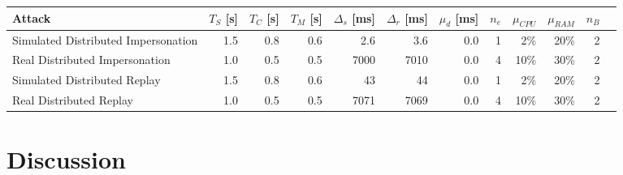 \documentclass[sigconf]{acmart}
\makeatletter
\newcommand{\Botnet}{CPSBot\@\xspace}
\makeatother
\begin{document}
\begin{table*}[tb]
    \centering
    \caption{Evaluation of \Botnet attacks in a simulated environment and real testbed.
    $T_S$, $T_C$, $T_M$ are the SCADA, adversarial estimation and traffic
    manipulation periods.
    $\Delta_{s}$ is the average time difference between the last valid RTU packet and the first
    packet spoofed by a bot.
    $\Delta_{r}$ is the average time difference between the last SCADA request and the first
    valid spoofed bot response.
    $\mu_{d}$ is the additional average delay introduced by the \Botnet measured
    from the SCADA server.
    $n_{e}$ is the number of Wireshark's expert info warnings and error
    messages.
    $\mu_{CPU}$ and $\mu_{RAM}$ are the approximate average CPU and RAM load
    on each bot. $n_B$ is the number of controlled substations.
    Our optimized \Botnet implementation is able to attack the system with delay ($\mu_d = 0$) as measured at the SCADA server.}
    \label{tab:attack-eval}
    \begin{tabular}{lrrrrrrrrrrr}
    \toprule
      \textbf{Attack} & $T_S$ [s]& $T_C$ [s] & $T_M$ [s] & $\Delta_{s}$ [ms] &
        $\Delta_{r}$ [ms]& $\mu_{d}$ [ms] & $n_{e}$ &
        $\mu_{CPU}$ & $\mu_{RAM}$ & $n_B$ \\
    \midrule
    Simulated Distributed Impersonation & 1.5 & 0.8  & 0.6  & 2.6 & 3.6 & 0.0 & 1 &
        2\% & 20\% & 2    \\
    \midrule
    Real Distributed Impersonation & 1.0 & 0.5 & 0.5 & 7000 & 7010 & 0.0 & 4 & 10\% & 30\%
        & 2\\
    \midrule
    Simulated Distributed Replay & 1.5 & 0.8  & 0.6  & 43 & 44 & 0.0 & 1 &
        2\% & 20\% & 2    \\
    \midrule
    Real Distributed Replay & 1.0 & 0.5 & 0.5 & 7071 & 7069 & 0.0 & 4 & 10\% & 30\%
        & 2  \\

    \bottomrule

    \end{tabular}
\end{table*}





\section{Discussion}
\label{sec:discussion}
\end{document}
